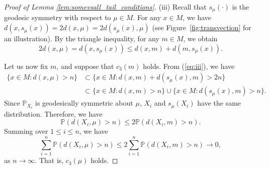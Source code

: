 \documentclass[10pt,a4paper]{amsart}
\begin{document}
\begin{proof}[Proof of Lemma \ref{lem:somevsall_tail_conditions}]
(iii) Recall that $s_\mu(\cdot)$ is the geodesic symmetry with respect to $\mu \in M$. For any $x \in M$, we have 
$d(x, s_\mu(x)) = 2d(x,\mu) = 2d(s_\mu(x),\mu)$ (see Figure~\ref{fig:transvection} for an illustration). By the triangle inequality, for any $m\in M$, we obtain 
\begin{equation}
    \label{eq:iii} 
    2d(x,\mu) = d(x, s_\mu(x)) \le d(x,m ) + d(m, s_\mu(x)).
\end{equation}

Let us now fix $m$, and suppose that $c_3(m)$ holds. 
From (\ref{eq:iii}), we have 
\begin{align*}
\{x\in M: d(x,\mu) > n\} &\subset \{x\in M: d(x,m) + d(s_\mu(x), m) > 2n\}\\
&\subset \{x\in M: d(x,m) > n\}\cup \{x\in M: d(s_\mu(x),m) > n\}.
\end{align*}
Since $\mathbb{P}_{X_i}$ is geodesically symmetric about $\mu$, $X_i$ and $s_\mu (X_i)$ have the same distribution. Therefore, we have 
$$
\mathbb{P}(d(X_i,\mu) > n ) \le 2\mathbb{P}(d(X_i,m) > n).$$
Summing over $1\le i\le n$, we have 
$$
\sum_{i=1}^n\mathbb{P}(d(X_i,\mu) > n ) \le 2\sum_{i=1}^n\mathbb{P}(d(X_i,m) > n) \to 0,
$$
as $n\to \infty$. That is, $c_3(\mu)$ holds.
\end{proof}
\end{document}
